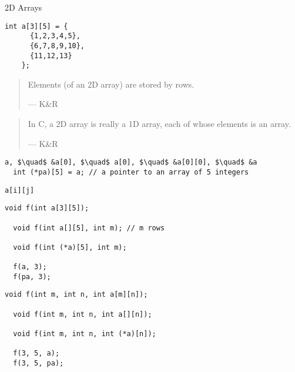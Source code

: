 \begin{frame}{}
  \centerline{\LARGE 2D Arrays}
\end{frame}

\begin{frame}[fragile]{}
  \begin{lstlisting}[style = Cstyle]
    int a[3][5] = {
      {1,2,3,4,5}, 
      {6,7,8,9,10},
      {11,12,13}
    }; 
  \end{lstlisting}

  \vspace{0.40cm}
  \pause
  \begin{quote}
    Elements (of an 2D array) are stored by rows.

    \hfill --- K\&R
  \end{quote}

  \vspace{0.80cm}
  \centerline{}
\end{frame}

\begin{frame}[fragile]{}
  \begin{quote}
    In C, a 2D array is really a 1D array,
    each of whose elements is an array.

    \hfill --- K\&R
  \end{quote}

  \vspace{0.50cm}
  \pause
  \begin{lstlisting}[style = Cstyle]
  a, $\quad$ &a[0], $\quad$ a[0], $\quad$ &a[0][0], $\quad$ &a
  int (*pa)[5] = a; // a pointer to an array of 5 integers
  \end{lstlisting}

  \vspace{0.30cm}
  \centerline{}

  \vspace{0.50cm}
  \pause
  \begin{lstlisting}[style = Cstyle]
  a[i][j]
  \end{lstlisting}
\end{frame}

\begin{frame}[fragile]{}
  \begin{lstlisting}[style = Cstyle]
  void f(int a[3][5]);

  void f(int a[][5], int m); // m rows

  void f(int (*a)[5], int m);

  f(a, 3);
  f(pa, 3);
  \end{lstlisting}

  \pause
  \begin{lstlisting}[style = Cstyle]
  void f(int m, int n, int a[m][n]);

  void f(int m, int n, int a[][n]);

  void f(int m, int n, int (*a)[n]);

  f(3, 5, a);
  f(3, 5, pa);
  \end{lstlisting}
\end{frame}
